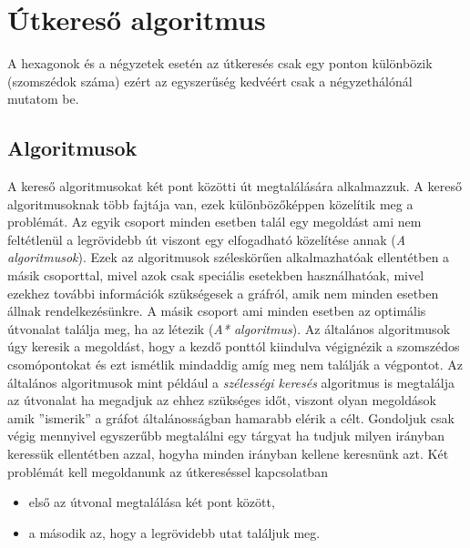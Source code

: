 \chapter{Útkereső algoritmus}

A hexagonok és a négyzetek esetén az útkeresés csak egy ponton különbözik (szomszédok száma) ezért az egyszerűség kedvéért csak a négyzethálónál mutatom be.

\section{Algoritmusok}

A kereső algoritmusokat két pont közötti út megtalálására alkalmazzuk. 
A kereső algoritmusoknak több fajtája van, ezek különbözőképpen közelítik meg a problémát. 
\newline
\newline Az egyik csoport minden esetben talál egy megoldást ami nem feltétlenül a legrövidebb út viszont egy elfogadható közelítése annak (\textit{A algoritmusok}). Ezek az algoritmusok széleskörűen alkalmazhatóak ellentétben a másik csoporttal, mivel azok csak speciális esetekben használhatóak, mivel ezekhez további információk szükségesek a gráfról, amik nem minden esetben állnak rendelkezésünkre.
\newline A másik csoport ami minden esetben az optimális útvonalat találja meg, ha az létezik (\textit{A* algoritmus}).
\newline
\newline Az általános algoritmusok úgy keresik a megoldást, hogy a kezdő ponttól kiindulva végignézik a szomszédos csomópontokat és ezt ismétlik mindaddig amíg meg nem találják a végpontot. Az általános algoritmusok mint például a \textit{szélességi keresés} algoritmus is megtalálja az útvonalat ha megadjuk az ehhez szükséges időt, viszont olyan megoldások amik ''ismerik'' a gráfot általánosságban hamarabb elérik a célt. Gondoljuk csak végig mennyivel egyszerűbb megtalálni egy tárgyat ha tudjuk milyen irányban keressük ellentétben azzal, hogyha minden irányban kellene keresnünk azt.
\newline
\newline Két problémát kell megoldanunk az útkereséssel kapcsolatban 
\begin{itemize}
\item első az útvonal megtalálása két pont között, 
\item a második az, hogy a legrövidebb utat találjuk meg. 
\end{itemize}

